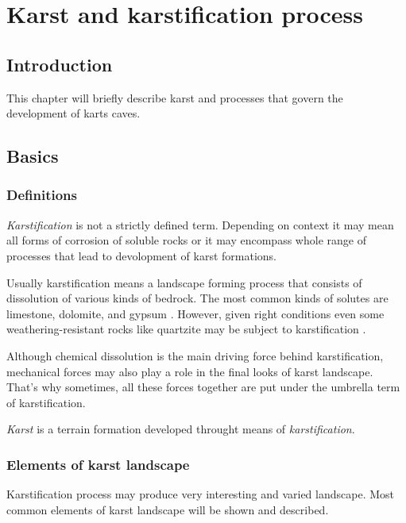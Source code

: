 \chapter{Karst and karstification process}
\section{Introduction}
This chapter will briefly describe karst and processes that govern the
development of karts caves.

\section{Basics}

\subsection{Definitions}
\emph{Karstification} is not a strictly defined term. Depending on context it may
mean all forms of corrosion of soluble rocks or it may encompass whole range of
processes that lead to devolopment of karst formations.

Usually karstification means a landscape forming process that consists of dissolution
of various kinds of bedrock. The most common kinds of solutes are limestone,
dolomite, and gypsum \parencite{karstglossary}. However, given right conditions
even some weathering-resistant rocks like quartzite may be subject to 
karstification \parencite{migon2010}.

Although chemical dissolution is the main driving force behind karstification,
mechanical forces may also play a role in the final looks of karst landscape.
That's why sometimes, all these forces together are put under the umbrella term
of karstification.

\emph{Karst} is a terrain formation developed throught means of
\emph{karstification}.

\subsection{Elements of karst landscape}

Karstification process may produce very interesting and varied landscape. Most
common elements of karst landscape will be shown and described.

